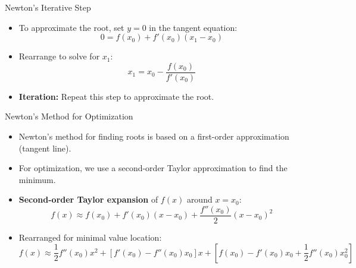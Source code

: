 \documentclass[serif, aspectratio=169]{beamer}
\begin{document}
\begin{frame}{Newton's Iterative Step}
\begin{itemize}
    \item To approximate the root, set \( y = 0 \) in the tangent equation:
    \[
    0 = f(x_0) + f'(x_0)(x_1 - x_0)
    \]
    \item Rearrange to solve for \( x_1 \):
    \[
    x_1 = x_0 - \frac{f(x_0)}{f'(x_0)}
    \]
    \item \textbf{Iteration:} Repeat this step to approximate the root.
\end{itemize}
\end{frame}

\begin{frame}{Newton's Method for Optimization}
\begin{itemize}
    \item Newton’s method for finding roots is based on a first-order approximation (tangent line).
    \item For optimization, we use a second-order Taylor approximation to find the minimum.
    \item \textbf{Second-order Taylor expansion} of \( f(x) \) around \( x = x_0 \):
    \[
    f(x) \approx f(x_0) + f'(x_0)(x - x_0) + \frac{f''(x_0)}{2}(x - x_0)^2
    \]
    \item Rearranged for minimal value location:
    \[
    f(x) \approx \frac{1}{2}f''(x_0)x^2 + [f'(x_0) - f''(x_0)x_0]x + [f(x_0) - f'(x_0)x_0 + \frac{1}{2}f''(x_0)x_0^2]
    \]
\end{itemize}
\end{frame}
\end{document}
